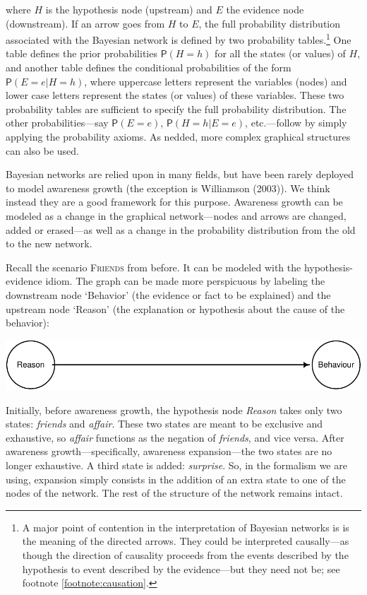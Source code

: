 \documentclass[
  11pt,
  dvipsnames,enabledeprecatedfontcommands, todos]{scrartcl}
\newcommand{\pr}[1]{\ensuremath{\mathsf{P}(#1)}}
\begin{document}
\noindent where \(H\) is the hypothesis node (upstream) and \(E\) the
evidence node (downstream). If an arrow goes from \(H\) to \(E\), the
full probability distribution associated with the Bayesian network is
defined by two probability tables.\footnote{A major point of contention
  in the interpretation of Bayesian networks is is the meaning of the
  directed arrows. They could be interpreted causally---as though the
  direction of causality proceeds from the events described by the
  hypothesis to event described by the evidence---but they need not be;
  see footnote \ref{footnote:causation}.} One table defines the prior
probabilities \(\pr{H=h}\) for all the states (or values) of \(H\), and
another table defines the conditional probabilities of the form
\(\pr{E=e \vert H=h}\), where uppercase letters represent the variables
(nodes) and lower case letters represent the states (or values) of these
variables. These two probability tables are sufficient to specify the
full probability distribution. The other probabilities---say \pr{E=e},
\pr{H=h \vert E=e}, etc.---follow by simply applying the probability
axioms. As nedded, more complex graphical structures can also be used.

Bayesian networks are relied upon in many fields, but have been rarely
deployed to model awareness growth (the exception is Williamson (2003)).
We think instead they are a good framework for this purpose. Awareness
growth can be modeled as a change in the graphical network---nodes and
arrows are changed, added or erased---as well as a change in the
probability distribution from the old to the new network.

Recall the scenario \textsc{Friends} from before. It can be modeled with
the hypothesis-evidence idiom. The graph can be made more perspicuous by
labeling the downstream node `Behavior' (the evidence or fact to be
explained) and the upstream node `Reason' (the explanation or hypothesis
about the cause of the behavior):

\begin{center}\includegraphics[width=0.5\linewidth,height=0.5\textheight]{ReplyToSteeleStefansson5_files/figure-latex/friendsDAG-1} \end{center}

\noindent Initially, before awareness growth, the hypothesis node
\textit{Reason} takes only two states: \textit{friends} and
\textit{affair}. These two states are meant to be exclusive and
exhaustive, so \textit{affair} functions as the negation of
\textit{friends}, and vice versa. After awareness growth---specifically,
awareness expansion---the two states are no longer exhaustive. A third
state is added: \textit{surprise}. So, in the formalism we are using,
expansion simply consists in the addition of an extra state to one of
the nodes of the network. The rest of the structure of the network
remains intact.
\end{document}
